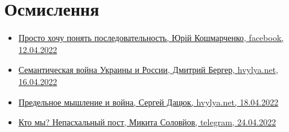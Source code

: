  
 
 
 
 
\section{Осмислення}
\label{sec:topics.vojna.osmyslenie}

\begin{itemize} %

\item \hyperlink{12_04_2022.fb.koshmarchenko_jurij.1.posledovatelnost}{%
Просто хочу понять последовательность, Юрій Кошмарченко, facebook, 12.04.2022%
}

\item \hyperlink{16_04_2022.stz.news.ua.hvylya.1.semantic_war_ukrros}{%
Семантическая война Украины и России, Дмитрий Бергер, hvylya.net, 16.04.2022
}

\item \hyperlink{18_04_2022.stz.news.ua.hvylya.1.predelnoje_myshlenie_i_vojna}{%
Предельное мышление и война, Сергей Дацюк, hvylya.net, 18.04.2022%
}

\item \hyperlink{24_04_2022.tg.solovjov_mikita.harkov.demsokyra.1.kto_my_nepashalnyj_post}{%
Кто мы? Непасхальный пост, Микита Соловйов, telegram, 24.04.2022%
}


\end{itemize} %
